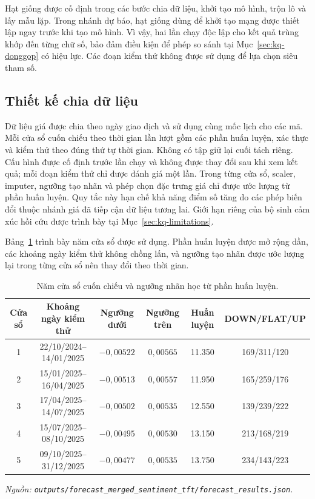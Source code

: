 \documentclass[12pt, a4paper, oneside]{report}
\begin{document}
Hạt giống được cố định trong các bước chia dữ liệu, khởi tạo mô hình, trộn lô và lấy mẫu lặp. Trong nhánh dự báo, hạt giống dùng để khởi tạo mạng được thiết lập ngay trước khi tạo mô hình. Vì vậy, hai lần chạy độc lập cho kết quả trùng khớp đến từng chữ số, bảo đảm điều kiện để phép so sánh tại Mục~\ref{sec:kq-donggop} có hiệu lực. Các đoạn kiểm thử không được sử dụng để lựa chọn siêu tham số.

\subsection{Thiết kế chia dữ liệu}

Dữ liệu giá được chia theo ngày giao dịch và sử dụng cùng mốc lịch cho các mã. Mỗi cửa sổ cuốn chiếu theo thời gian lần lượt gồm các phần huấn luyện, xác thực và kiểm thử theo đúng thứ tự thời gian. Không có tập giữ lại cuối tách riêng. Cấu hình được cố định trước lần chạy và không được thay đổi sau khi xem kết quả; mỗi đoạn kiểm thử chỉ được đánh giá một lần. Trong từng cửa sổ, scaler, imputer, ngưỡng tạo nhãn và phép chọn đặc trưng giá chỉ được ước lượng từ phần huấn luyện. Quy tắc này hạn chế khả năng điểm số tăng do các phép biến đổi thuộc nhánh giá đã tiếp cận dữ liệu tương lai. Giới hạn riêng của bộ sinh cảm xúc hồi cứu được trình bày tại Mục~\ref{sec:kq-limitations}.

Bảng~\ref{tab:kq-windows} trình bày năm cửa sổ được sử dụng. Phần huấn luyện được mở rộng dần, các khoảng ngày kiểm thử không chồng lấn, và ngưỡng tạo nhãn được ước lượng lại trong từng cửa sổ nên thay đổi theo thời gian.

\begin{table}[H]
  \centering
  \caption{Năm cửa sổ cuốn chiếu và ngưỡng nhãn học từ phần huấn luyện.}
  \label{tab:kq-windows}
  \begin{tabular}{c c c c c c}
    \toprule
    Cửa sổ & Khoảng ngày kiểm thử & Ngưỡng dưới & Ngưỡng trên & Huấn luyện & DOWN/FLAT/UP \\
    \midrule
    1 & 22/10/2024--14/01/2025 & $-0{,}00522$ & $0{,}00565$ & 11.350 & 169/311/120 \\
    2 & 15/01/2025--16/04/2025 & $-0{,}00513$ & $0{,}00557$ & 11.950 & 165/259/176 \\
    3 & 17/04/2025--14/07/2025 & $-0{,}00502$ & $0{,}00535$ & 12.550 & 139/239/222 \\
    4 & 15/07/2025--08/10/2025 & $-0{,}00495$ & $0{,}00530$ & 13.150 & 213/168/219 \\
    5 & 09/10/2025--31/12/2025 & $-0{,}00477$ & $0{,}00535$ & 13.750 & 234/143/223 \\
    \bottomrule
  \end{tabular}
\noindent\textit{Nguồn: \texttt{outputs/forecast\_merged\_sentiment\_tft/forecast\_results.json}.}
\end{table}
\end{document}
